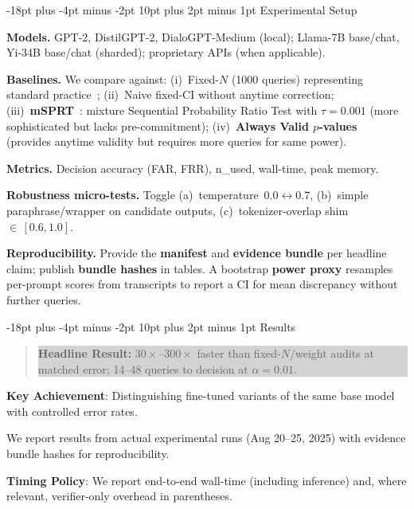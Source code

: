 \documentclass[11pt]{article}
\makeatletter
\renewcommand\section{\@startsection{section}{1}{\z@}%
  {-18pt plus -4pt minus -2pt}%
  {10pt plus 2pt minus 1pt}%
  {\normalfont\Large\bfseries}}
\makeatother
\begin{document}
\section{Experimental Setup}

\textbf{Models.} GPT-2, DistilGPT-2, DialoGPT-Medium (local); Llama-7B base/chat, Yi-34B base/chat (sharded); proprietary APIs (when applicable).

\textbf{Baselines.} We compare against: (i)~Fixed-$N$ (1000 queries) representing standard practice~\cite{hendrycks2021many}; (ii)~Naive fixed-CI without anytime correction; (iii)~\textbf{mSPRT}~\cite{johari2017peeking}: mixture Sequential Probability Ratio Test with $\tau=0.001$ (more sophisticated but lacks pre-commitment); (iv)~\textbf{Always Valid $p$-values}~\cite{ramdas2023gametheoretic} (provides anytime validity but requires more queries for same power).

\textbf{Metrics.} Decision accuracy (FAR, FRR), n\_used, wall-time, peak memory.

\textbf{Robustness micro-tests.} Toggle (a)~temperature~$0.0 \leftrightarrow 0.7$, (b)~simple paraphrase/wrapper on candidate outputs, (c)~tokenizer-overlap shim~${\in}\,[0.6,1.0]$.

\textbf{Reproducibility.} Provide the \textbf{manifest} and \textbf{evidence bundle} per headline claim; publish \textbf{bundle hashes} in tables. A bootstrap \textbf{power proxy} resamples per-prompt scores from transcripts to report a CI for mean discrepancy without further queries.

\section{Results}
\label{sec:results}

\begin{quote}
\colorbox{lightgray}{\parbox{0.95\textwidth}{\textbf{Headline Result:} $30{\times}$--$300{\times}$ faster than fixed-$N$/weight audits at matched error; 14--48 queries to decision at $\alpha=0.01$.}}
\end{quote}

\noindent\textbf{Key Achievement}: Distinguishing fine-tuned variants of the same base model with controlled error rates.

We report results from actual experimental runs (Aug 20--25, 2025) with evidence bundle hashes for reproducibility.

\textbf{Timing Policy}: We report end-to-end wall-time (including inference) and, where relevant, verifier-only overhead in parentheses.
\end{document}
